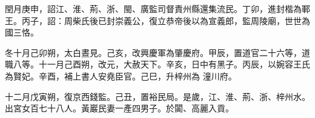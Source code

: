 \begin{pinyinscope}
 閏月庚申，詔江、淮、荊、浙、閩、廣監司督責州縣還集流民。丁卯，進封楷為鄆王。丙子，詔：周柴氏後已封崇義公，復立恭帝後以為宣義郎，監周陵廟，世世為國三恪。



 冬十月己卯朔，太白晝見。己亥，改興慶軍為肇慶府。甲辰，置道官二十六等，道職八等。十一月己酉朔，改元，大赦天下。辛亥，日中有黑子。丙辰，以婉容王氏為賢妃。辛酉，補上書人安堯臣官。己巳，升梓州為
 潼川府。



 十二月戊寅朔，復京西錢監。己丑，置裕民局。是歲，江、淮、荊、浙、梓州水。出宮女百七十八人。黃巖民妻一產四男子。於闐、高麗入貢。



\end{pinyinscope}